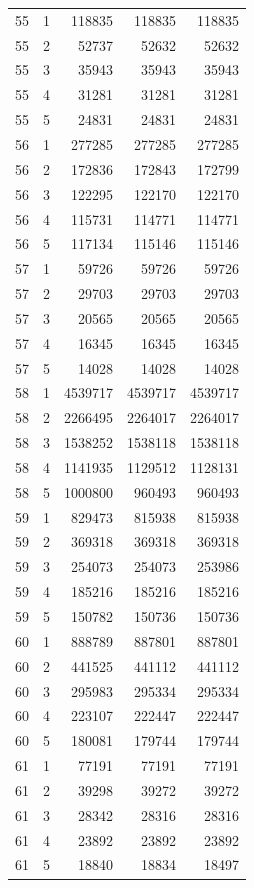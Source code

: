 \begin{longtable}{rrrrr}
55 & 1 & 118835 & 118835 & 118835 \\
55 & 2 & 52737 & 52632 & 52632 \\
55 & 3 & 35943 & 35943 & 35943 \\
55 & 4 & 31281 & 31281 & 31281 \\
55 & 5 & 24831 & 24831 & 24831 \\
56 & 1 & 277285 & 277285 & 277285 \\
56 & 2 & 172836 & 172843 & 172799 \\
56 & 3 & 122295 & 122170 & 122170 \\
56 & 4 & 115731 & 114771 & 114771 \\
56 & 5 & 117134 & 115146 & 115146 \\
57 & 1 & 59726 & 59726 & 59726 \\
57 & 2 & 29703 & 29703 & 29703 \\
57 & 3 & 20565 & 20565 & 20565 \\
57 & 4 & 16345 & 16345 & 16345 \\
57 & 5 & 14028 & 14028 & 14028 \\
58 & 1 & 4539717 & 4539717 & 4539717 \\
58 & 2 & 2266495 & 2264017 & 2264017 \\
58 & 3 & 1538252 & 1538118 & 1538118 \\
58 & 4 & 1141935 & 1129512 & 1128131 \\
58 & 5 & 1000800 & 960493 & 960493 \\
59 & 1 & 829473 & 815938 & 815938 \\
59 & 2 & 369318 & 369318 & 369318 \\
59 & 3 & 254073 & 254073 & 253986 \\
59 & 4 & 185216 & 185216 & 185216 \\
59 & 5 & 150782 & 150736 & 150736 \\
60 & 1 & 888789 & 887801 & 887801 \\
60 & 2 & 441525 & 441112 & 441112 \\
60 & 3 & 295983 & 295334 & 295334 \\
60 & 4 & 223107 & 222447 & 222447 \\
60 & 5 & 180081 & 179744 & 179744 \\
61 & 1 & 77191 & 77191 & 77191 \\
61 & 2 & 39298 & 39272 & 39272 \\
61 & 3 & 28342 & 28316 & 28316 \\
61 & 4 & 23892 & 23892 & 23892 \\
61 & 5 & 18840 & 18834 & 18497 \\

\end{longtable}
